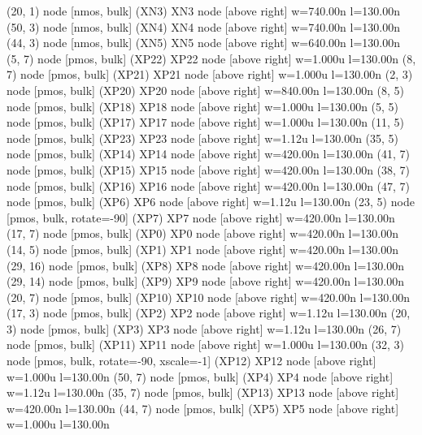 \begin{circuitikz}[american]
	(20, 1) node [nmos, bulk] (XN3) {XN3} node [above right] {\tiny {w=740.00n l=130.00n}}
	(50, 3) node [nmos, bulk] (XN4) {XN4} node [above right] {\tiny {w=740.00n l=130.00n}}
	(44, 3) node [nmos, bulk] (XN5) {XN5} node [above right] {\tiny {w=640.00n l=130.00n}}
	(5, 7) node [pmos, bulk] (XP22) {XP22} node [above right] {\tiny {w=1.000u l=130.00n}}
	(8, 7) node [pmos, bulk] (XP21) {XP21} node [above right] {\tiny {w=1.000u l=130.00n}}
	(2, 3) node [pmos, bulk] (XP20) {XP20} node [above right] {\tiny {w=840.00n l=130.00n}}
	(8, 5) node [pmos, bulk] (XP18) {XP18} node [above right] {\tiny {w=1.000u l=130.00n}}
	(5, 5) node [pmos, bulk] (XP17) {XP17} node [above right] {\tiny {w=1.000u l=130.00n}}
	(11, 5) node [pmos, bulk] (XP23) {XP23} node [above right] {\tiny {w=1.12u l=130.00n}}
	(35, 5) node [pmos, bulk] (XP14) {XP14} node [above right] {\tiny {w=420.00n l=130.00n}}
	(41, 7) node [pmos, bulk] (XP15) {XP15} node [above right] {\tiny {w=420.00n l=130.00n}}
	(38, 7) node [pmos, bulk] (XP16) {XP16} node [above right] {\tiny {w=420.00n l=130.00n}}
	(47, 7) node [pmos, bulk] (XP6) {XP6} node [above right] {\tiny {w=1.12u l=130.00n}}
	(23, 5) node [pmos, bulk, rotate=-90] (XP7) {XP7} node [above right] {\tiny {w=420.00n l=130.00n}}
	(17, 7) node [pmos, bulk] (XP0) {XP0} node [above right] {\tiny {w=420.00n l=130.00n}}
	(14, 5) node [pmos, bulk] (XP1) {XP1} node [above right] {\tiny {w=420.00n l=130.00n}}
	(29, 16) node [pmos, bulk] (XP8) {XP8} node [above right] {\tiny {w=420.00n l=130.00n}}
	(29, 14) node [pmos, bulk] (XP9) {XP9} node [above right] {\tiny {w=420.00n l=130.00n}}
	(20, 7) node [pmos, bulk] (XP10) {XP10} node [above right] {\tiny {w=420.00n l=130.00n}}
	(17, 3) node [pmos, bulk] (XP2) {XP2} node [above right] {\tiny {w=1.12u l=130.00n}}
	(20, 3) node [pmos, bulk] (XP3) {XP3} node [above right] {\tiny {w=1.12u l=130.00n}}
	(26, 7) node [pmos, bulk] (XP11) {XP11} node [above right] {\tiny {w=1.000u l=130.00n}}
	(32, 3) node [pmos, bulk, rotate=-90, xscale=-1] (XP12) {XP12} node [above right] {\tiny {w=1.000u l=130.00n}}
	(50, 7) node [pmos, bulk] (XP4) {XP4} node [above right] {\tiny {w=1.12u l=130.00n}}
	(35, 7) node [pmos, bulk] (XP13) {XP13} node [above right] {\tiny {w=420.00n l=130.00n}}
	(44, 7) node [pmos, bulk] (XP5) {XP5} node [above right] {\tiny {w=1.000u l=130.00n}}



\end{circuitikz}
